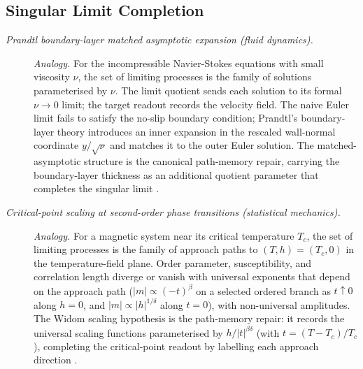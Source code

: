 \subsection*{ Singular Limit Completion}
\begingroup\small
\begin{description}
\item[\emph{Prandtl boundary-layer matched asymptotic
expansion (fluid dynamics).}] \textit{Analogy.}
For the incompressible Navier-Stokes equations with
small viscosity \(\nu\), the set of limiting
processes is the family of solutions parameterised by
\(\nu\).  The limit quotient sends each solution to
its formal \(\nu\to 0\) limit; the target readout
records the velocity field.  The naive Euler limit
fails to satisfy the no-slip boundary condition;
Prandtl's boundary-layer theory introduces an inner
expansion in the rescaled wall-normal coordinate
\(y/\sqrt{\nu}\) and matches it to the outer Euler
solution.  The matched-asymptotic structure is the
canonical path-memory repair, carrying the
boundary-layer thickness as an additional quotient
parameter that completes the singular limit
\citep{Prandtl1904BoundaryLayer}.

\item[\emph{Critical-point scaling at second-order
phase transitions (statistical mechanics).}] \textit{Analogy.}
For a magnetic system near its critical temperature
\(T_c\), the set of limiting processes is the family
of approach paths to \((T,h)=(T_c,0)\) in the
temperature-field plane.  Order parameter,
susceptibility, and correlation length diverge or
vanish with universal exponents that depend on the approach path (\(|m|\propto(-t)^\beta\) on a selected ordered branch as \(t\uparrow0\) along \(h=0\), and \(|m|\propto|h|^{1/\delta}\) along \(t=0\)), with non-universal amplitudes.
The Widom scaling hypothesis is the path-memory
repair: it records the universal scaling functions
parameterised by \(h/|t|^{\beta\delta}\) (with
\(t=(T-T_c)/T_c\)), completing the critical-point
readout by labelling each approach direction
\citep{Stanley1971PhaseTransitions}.
\end{description}
\endgroup

